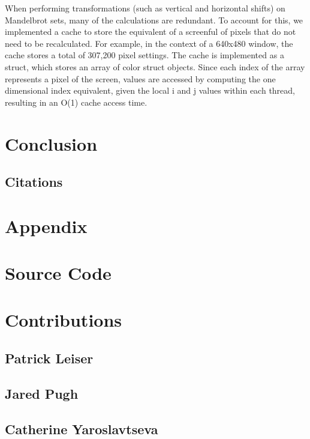 \documentclass{article}
\begin{document}
When performing transformations (such as vertical and horizontal shifts) on Mandelbrot sets, many of the calculations are redundant. To account for this, we implemented a cache to store the equivalent of a screenful of pixels that do not need to be recalculated. For example, in the context of a 640x480 window, the cache stores a total of 307,200 pixel settings. The cache is implemented as a struct, which stores an array of color struct objects. Since each index of the array represents a pixel of the screen, values are accessed by computing the one dimensional index equivalent, given the local i and j values within each thread, resulting in an O(1) cache access time. 

\section{Conclusion}

\begin{center}

\section*{Citations}

\end{center}

\section{Appendix}
\appendix

\section{Source Code}

\section{Contributions}

\subsection{Patrick Leiser}

\subsection{Jared Pugh}

\subsection{Catherine Yaroslavtseva}
\end{document}
